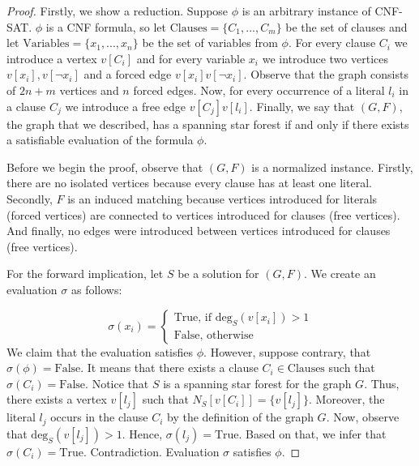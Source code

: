 \documentclass[en]{pracamgr}
\newcommand{\cnfsat}{{\sc CNF-SAT}}
\newcommand{\degree}[2]{\textrm{deg}_{#1}(#2)}
\begin{document}
\begin{proof}
	Firstly, we show a reduction. Suppose $\phi$ is an arbitrary instance of \cnfsat{}. $\phi$ is a CNF formula, so let $\textrm{Clauses}=\{C_1,...,C_m\}$ be the set of clauses and let $\textrm{Variables}=\{x_1,...,x_n\}$ be the set of variables from $\phi$. For every clause $C_i$ we introduce a vertex $v[C_i]$ and for every variable $x_i$ we introduce two vertices $v[x_i],v[\neg x_i]$ and a forced edge $v[x_i]v[\neg x_i]$. Observe that the graph consists of $2n+m$ vertices and $n$ forced edges. Now, for every occurrence of a literal $l_i$ in a clause $C_j$ we introduce a free edge $v[C_j]v[l_i]$. Finally, we say that $(G,F)$, the graph that we described, has a spanning star forest if and only if there exists a satisfiable evaluation of the formula $\phi$.
	
	Before we begin the proof, observe that $(G,F)$ is a normalized instance. Firstly, there are no isolated vertices because every clause has at least one literal. Secondly, $F$ is an induced matching because vertices introduced for literals (forced vertices) are connected to vertices introduced for clauses (free vertices). And finally, no edges were introduced between vertices introduced for clauses (free vertices).
	
	For the forward implication, let $S$ be a solution for $(G,F)$. We create an evaluation $\sigma$ as follows:
	
	\begin{equation*}
		\sigma(x_i) = 
		\begin{cases}
			\textrm{True}\text{, if $\degree{S}{v[x_i]} > 1$} \\
			\textrm{False}\text{, otherwise}
		\end{cases}
	\end{equation*}
	We claim that the evaluation satisfies $\phi$. However, suppose contrary, that $\sigma(\phi)=\textrm{False}$. It means that there exists a clause $C_i \in \textrm{Clauses}$ such that $\sigma(C_i)=\textrm{False}$. Notice that $S$ is a spanning star forest for the graph $G$. Thus, there exists a vertex $v[l_j]$ such that $N_S[v[C_i]] = \{v[l_j]\}$. Moreover, the literal $l_j$ occurs in the clause $C_i$ by the definition of the graph $G$. Now, observe that $\degree{S}{v[l_j]} > 1$. Hence, $\sigma(l_j)=\textrm{True}$. Based on that, we infer that $\sigma(C_i)=\textrm{True}$. Contradiction. Evaluation $\sigma$ satisfies $\phi$.
	

\end{proof}
\end{document}
